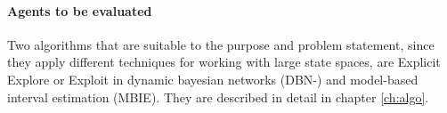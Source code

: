 \paragraph{Agents to be evaluated}

Two algorithms that are suitable to the purpose and problem statement, since they apply different techniques for working with large state spaces, are Explicit Explore or Exploit in dynamic bayesian networks (DBN-\etre) and model-based interval estimation (MBIE). They are described in detail in chapter \ref{ch:algo}. 

